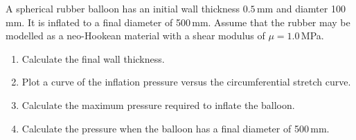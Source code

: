 \documentclass[11pt]{article}
\newcommand{\solution}{{\bf Solution}:\\}
\begin{document}
\noindent 
A spherical rubber balloon has an initial wall thickness
$0.5$\,mm and diamter 100\,mm. It is inflated to a final diameter of
500\,mm. Assume that the rubber may  be modelled as a neo-Hookean
material with a shear modulus of $\mu=1.0$\,MPa.
\begin{enumerate}
\item Calculate the final wall thickness.
\item Plot  a curve of the inflation pressure versus the
circumferential stretch curve.
\item Calculate the maximum pressure
required to inflate  the balloon.
\item Calculate the pressure when the balloon has a final diameter of
500\,mm.
\end{enumerate}

%
%
\end{document}
